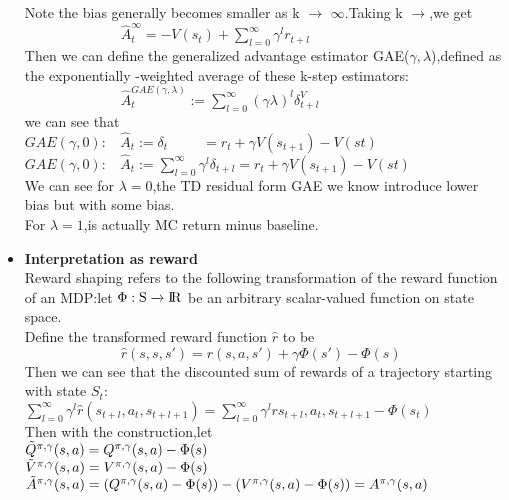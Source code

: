 \begin{itemize}
    Note the bias generally becomes smaller as k $\xrightarrow{}$ ${\infty}$.Taking k $\xrightarrow{}$,we get\\
    $~~~~~~~~~~~~~~~~~~~~~~~~~~~~~~~\hat{A}^{\infty}_{t}=-V(s_t) + {\sum_{l=0}^{\infty}{\gamma^{l}r_{t+l}}}$\\
    Then we can define the generalized advantage estimator GAE(${\gamma},{\lambda}$),defined as the exponentially -weighted average of these k-step estimators:\\
    $~~~~~~~~~~~~~~~~~~~~~~~~~~~~~~~\hat{A}^{GAE({\gamma},{\lambda})}_{t}:={\sum_{l=0}^{\infty}{(\gamma\lambda)}^{l}{\delta}^{V}_{t+l}}$\\
    we can see that\\
    ${GAE({\gamma},0)}:~~~~\hat{A}_t:={\delta}_t~~~~~~~~~~~={r_t}+{\gamma}V(s_{t+1})-V(s{t})$\\
    ${GAE({\gamma},0)}:~~~~\hat{A}_t:={\sum_{l=0}^{\infty}{\gamma^{l}}{{\delta}_{t+l}}}={r_t}+{\gamma}V(s_{t+1})-V(s{t})$\\
    We can see for ${\lambda = 0}$,the TD residual form GAE we know introduce lower bias but with some bias.\\
    For ${\lambda = 1}$,is actually MC return minus baseline.\\
    \item \large{\bf Interpretation as reward}\\
    Reward shaping refers to the following transformation of the reward function of an MDP:let $\Phi :{\rm S} \xrightarrow{} {\rm I\!R}$ be an arbitrary scalar-valued function on state space.\\
    Define the transformed reward function ${\hat{r}}$ to be\\
    $~~~~~~~~~~~~~~~~~~~~~~~~~~~~~~~\hat{r}(s,s,s')=r(s,a,s') + {\gamma}{\Phi(s')} -{\Phi(s)}$\\
    Then we can see that the discounted sum of rewards of a trajectory starting with state $S_t:$\\
    $\sum_{l=0}^{\infty}{{\gamma}^{l}\hat{r}(s_{t+l},a_t,s_{t+l+1})} = \sum_{l=0}^{\infty}{\gamma}^{l}r{s_{t+l},a_t,s_{t+l+1}}-{\Phi(s_t)}$\\
    Then with the construction,let\\
    {$\Tilde{Q}^{\pi,\gamma}(s,a)=Q^{\pi,\gamma}(s,a)-\Phi(s)$}\\
    {$\Tilde{V}^{\pi,\gamma}(s,a)=V^{\pi,\gamma}(s,a)-\Phi(s)$}\\
    {$\Tilde{A}^{\pi,\gamma}(s,a)=(Q^{\pi,\gamma}(s,a)-\Phi(s))-(V^{\pi,\gamma}(s,a)-\Phi(s))=A^{\pi,\gamma}(s,a)$}\\

\end{itemize}
